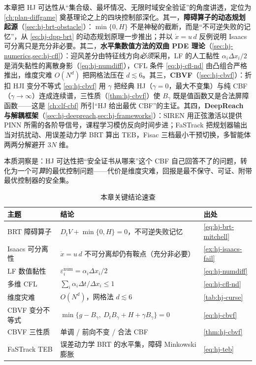 本章把 HJ 可达性从“集合级、最坏情况、无限时域安全验证”的角度讲透，定位为 \cref{ch:plan-diffgame} 奠基理论之上的四块控制部深化。其一，\textbf{障碍算子的动态规划起源}（\cref{sec:hj-brt-obstacle}）：$\min\{0,H\}$ 不是神秘的截断，而是“不可逆失败的记忆”，从 \cref{eq:hj-dpp-brt} 的动态规划原理一步推出；并以 $\dot x=u\,d$ 反例说明 Isaacs 可分离只是充分非必要。其二，\textbf{水平集数值方法的双曲 PDE 理论}（\cref{sec:hj-numerics,sec:hj-cfl}）：迎风差分由特征线方向\emph{必须}采用，LF 的人工黏性 $\alpha_i\Delta x_i/2$ 是消失黏性的离散身影（\cref{eq:hj-numdiff}），CFL 条件 \cref{eq:hj-cfl-nd} 由凸组合严格推出，维度灾难 $O(N^d)$ 把网格法压在 $d\lesssim6$。其三，\textbf{CBVF}（\cref{sec:hj-cbvf}）：折扣 HJI 变分不等式 \cref{eq:hj-cbvf} 用 $\gamma$ 把经典 HJ（$\gamma=0$，最大不变集）与纯 CBF（$\gamma\to\infty$）连成连续谱，三性质（\cref{thm:hj-cbvf}）使 $B_\gamma$ 既是值函数又是合法屏障函数——这是 \cref{ch:clf-cbf} 所引“HJ 给出最优 CBF”的主证。其四，\textbf{DeepReach 与解耦框架}（\cref{sec:hj-deepreach,sec:hj-frameworks}）：SIREN 用正弦激活以提供 PINN 所需的各阶导信号，课程学习模仿反向时间步进；FaSTrack 把规划器输出当对抗扰动、用误差动力学 BRT 算出 TEB，Fisac 三档最小干预切换，多智能体两两分解避开 $3N$ 维。

本质洞察是：HJ 可达性把“安全证书从哪来”这个 CBF 自己回答不了的问题，转化为一个可\emph{算}的最优控制问题——代价是维度灾难，回报是最不保守、可证、附带最优控制器的安全集。

\begin{table}[H]\centering\small
\caption{本章关键结论速查}
\label{tab:hj-summary}
\begin{tabular}{lll}
\toprule
主题 & 结论 & 出处 \\
\midrule
BRT 障碍算子 & $D_tV+\min\{0,H\}=0$，不可逆失败记忆 & \cref{eq:hj-brt-mitchell} \\
Isaacs 可分离性 & $\dot x=u\,d$ 不可分离却仍有鞍点（充分非必要） & \cref{ex:hj-isaacs-fail} \\
LF 数值黏性 & $\varepsilon_i^{\mathrm{num}}=\alpha_i\Delta x_i/2$ & \cref{eq:hj-numdiff} \\
多维 CFL & $\sum_i\alpha_i\Delta t/\Delta x_i\le1$ & \cref{eq:hj-cfl-nd} \\
维度灾难 & $O(N^d)$，网格法 $d\lesssim6$ & \cref{tab:hj-curse} \\
CBVF 变分不等式 & $\min\{g-B_\gamma,\ D_tB_\gamma+H+\gamma B_\gamma\}=0$ & \cref{eq:hj-cbvf} \\
CBVF 三性质 & 单调 / 前向不变 / 合法 CBF & \cref{thm:hj-cbvf} \\
FaSTrack TEB & 误差动力学 BRT 的水平集，障碍 Minkowski 膨胀 & \cref{eq:hj-teb} \\
\bottomrule
\end{tabular}
\end{table}

